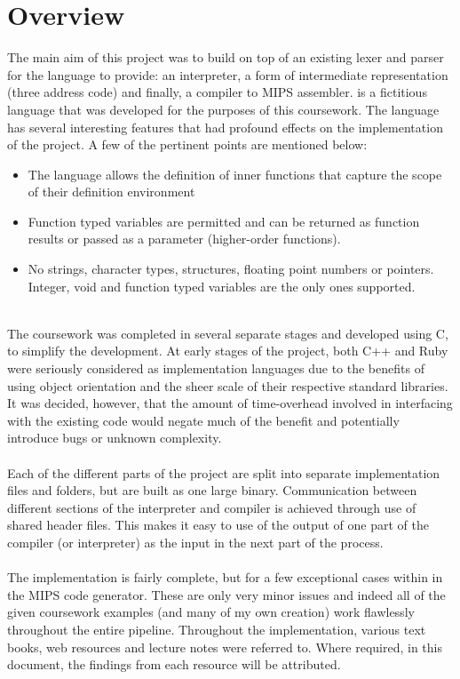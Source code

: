 \chapter{Overview}

The main aim of this project was to build on top of an existing lexer and parser for the \mmc language to provide: an interpreter, a form of intermediate representation (three address code) and finally, a compiler to MIPS assembler. \mmc is a fictitious language that was developed for the purposes of this coursework. The language has several interesting features that had profound effects on the implementation of the project. A few of the pertinent points are mentioned below:

\begin{itemize}
	\item The language allows the definition of inner functions that capture the scope of their definition environment
	\item Function typed variables are permitted and can be returned as function results or passed as a parameter (higher-order functions).
	\item No strings, character types, structures, floating point numbers or pointers. Integer, void and function typed variables are the only ones supported.
\end{itemize}
\vspace{-0.25cm}\ \\
The coursework was completed in several separate stages and developed using C, to simplify the development. At early stages of the project, both C++ and Ruby were seriously considered as implementation languages due to the benefits of using object orientation and the sheer scale of their respective standard libraries. It was decided, however, that the amount of time-overhead involved in interfacing with the existing code would negate much of the benefit and potentially introduce bugs or unknown complexity.
\ \\ \ \\
Each of the different parts of the project are split into separate implementation files and folders, but are built as one large binary. Communication between different sections of the interpreter and compiler is achieved through use of shared header files. This makes it easy to use of the output of one part of the compiler (or interpreter) as the input in the next part of the process.
\ \\ \ \\
The implementation is fairly complete, but for a few exceptional cases within in the MIPS code generator. These are only very minor issues and indeed all of the given coursework examples (and many of my own creation) work flawlessly throughout the entire pipeline. Throughout the implementation, various text books, web resources and lecture notes were referred to. Where required, in this document, the findings from each resource will be attributed.

